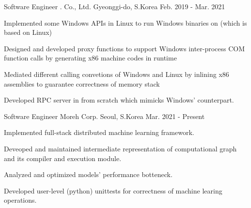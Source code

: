 

\begin{cventries}

  \cventry
    {Software Engineer} %
    {\mycompany{}. Co., Ltd.} %
    {Gyeonggi-do, S.Korea} %
    {Feb. 2019 - Mar. 2021} %
    {
      \begin{cvitems} %
        \item {Implemented some Windows APIs in Linux to run Windows binaries on \mycompany{} (which is based on Linux)}
	\item {Designed and developed proxy functions to support Windows inter-process COM function calls by generating x86 machine codes in runtime}
	\item {Mediated different calling convetions of Windows and Linux by inlining x86 assemblies to guarantee correctness of memory stack}
	\item {Developed RPC server in \mycompany{} from scratch which mimicks Windows' counterpart.}  
      \end{cvitems}
    }

  \cventry
    {Software Engineer} %
    {Moreh Corp.} %
    {Seoul, S.Korea} %
    {Mar. 2021 - Present} %
    {
      \begin{cvitems} %
        \item {Implemented full-stack distributed machine learning framework.}
        \item {Deveoped and maintained intermediate representation of computational graph and its compiler and execution module.}
        \item {Analyzed and optimized models' performance botteneck.}
	\item {Developed user-level (python) unittests for correctness of machine learing operations.}
      \end{cvitems}
    }

\end{cventries}